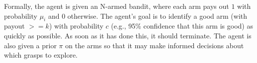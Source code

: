 \documentclass[conference,onecolumn]{IEEEtran}
\begin{document}
Formally, the agent is given an N-armed bandit, where each arm pays
out $1$ with probability $\mu_i$ and $0$ otherwise.  The agent's goal
is to identify a good arm (with payout $>= k$) with probability $c$
(e.g., 95\% confidence that this arm is good) as quickly as possible.
As soon as it has done this, it should terminate.  The agent is also
given a prior $\pi$ on the arms so that it may make informed decisions
about which grasps to explore.





\end{document}
